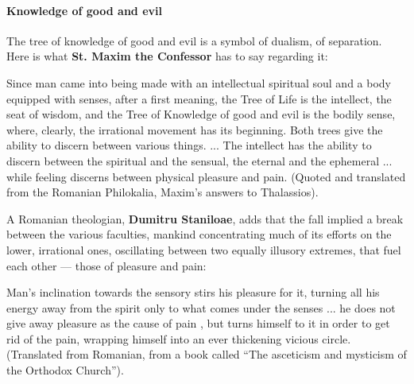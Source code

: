 \paragraph{Knowledge of good and evil}


The tree of knowledge of good and evil is a symbol of dualism, of separation. Here is what \textbf{St. Maxim the Confessor} has to say regarding it:

\begin{quotex}
Since man came into being made with an intellectual spiritual soul and a body equipped with senses, after a first meaning, the Tree of Life is the intellect, the seat of wisdom, and the Tree of Knowledge of good and evil is the bodily sense, where, clearly, the irrational movement has its beginning. Both trees give the ability to discern between various things. ... The intellect has the ability to discern between the spiritual and the sensual, the eternal and the ephemeral ... while feeling discerns between physical pleasure and pain. (Quoted and translated from the Romanian Philokalia, Maxim's answers to Thalassios).
\end{quotex}


A Romanian theologian, \textbf{Dumitru Staniloae}, adds that the fall implied a break between the various faculties, mankind concentrating much of its efforts on the lower, irrational ones, oscillating between two equally illusory extremes, that fuel each other --- those of pleasure and pain:

\begin{quotex}
Man's inclination towards the sensory stirs his pleasure for it, turning all his energy away from the spirit only to what comes under the senses ... he does not give away pleasure as the cause of pain , but turns himself to it in order to get rid of the pain, wrapping himself into an ever thickening vicious circle. (Translated from Romanian, from a book called ``The asceticism and mysticism of the Orthodox Church'').
\end{quotex}


